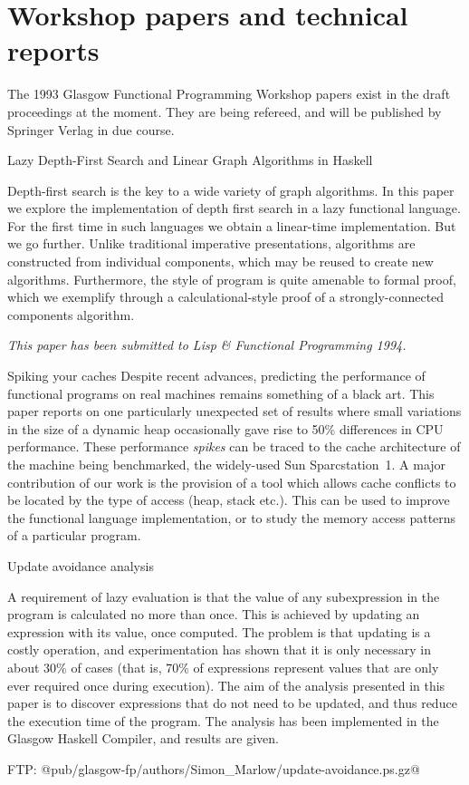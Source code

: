 \section{Workshop papers and technical reports}

The 1993 Glasgow Functional Programming Workshop papers exist in
the draft proceedings at the moment.  They are being refereed, and will
be published by Springer Verlag in due course.

{Lazy Depth-First Search and Linear Graph Algorithms in Haskell}
{\GlasgowNinetyThree{}}
{
Depth-first search is the key to a wide variety of graph algorithms.
In this paper we explore the implementation of depth first search in a
lazy functional language. For the first time in such languages we
obtain a linear-time implementation.  But we go further.  Unlike
traditional imperative presentations, algorithms are constructed from
individual components, which may be reused to create new
algorithms. Furthermore, the style of program is quite amenable to
formal proof, which we exemplify through a calculational-style proof
of a strongly-connected components algorithm.

{\em This paper has been submitted to Lisp \& Functional Programming 1994.}
}

{Spiking your caches}
{\GlasgowNinetyThree{}}
{
Despite recent advances, predicting the performance of functional
programs on real machines remains something of a black art.  This
paper reports on one particularly unexpected set of results where
small variations in the size of a dynamic heap occasionally gave rise
to 50\% differences in CPU performance.  These performance {\em
spikes} can be traced to the cache architecture of the machine being
benchmarked, the widely-used Sun Sparcstation~1.  A major contribution
of our work is the provision of a tool which allows cache conflicts
to be located by the type of access (heap, stack etc.).  This can
be used to improve the functional language implementation, or to
study the memory access patterns of a particular program.
}

{Update avoidance analysis}
{\GlasgowNinetyThree{}}
{
A requirement  of lazy    evaluation  is that     the value  of    any
subexpression in the program is calculated no more than once.  This is
achieved by updating an expression with its value, once computed.  The
problem is that  updating is a  costly operation,  and experimentation
has shown that it is only necessary  in about 30\%  of cases (that is,
70\% of expressions represent values that  are only ever required once
during execution).  The aim of the analysis presented in this paper is
to discover  expressions  that do not  need  to be  updated,  and thus
reduce  the  execution time  of  the program.   The  analysis has been
implemented in the Glasgow Haskell Compiler, and results are given.

FTP: @pub/glasgow-fp/authors/Simon_Marlow/update-avoidance.ps.gz@
}

